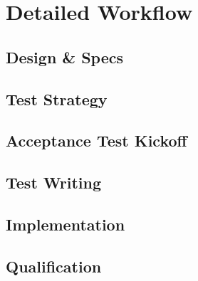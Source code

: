 \section{Detailed Workflow}\label{sec:detailed-workflow}


\subsection{Design & Specs}\label{subsec:design-&-specs}

\subsection{Test Strategy}\label{subsec:test-strategy}

\subsection{Acceptance Test Kickoff}\label{subsec:acceptance-test-kickoff}

\subsection{Test Writing}\label{subsec:test-writing}

\subsection{Implementation}\label{subsec:implementation}

\subsection{Qualification}\label{subsec:qualification}
